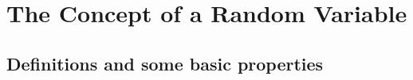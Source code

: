 \documentclass[a4paper, oneside]{book}
\begin{document}



\chapter{The Concept of a Random Variable}


\section{Definitions and some basic properties}
\end{document}
